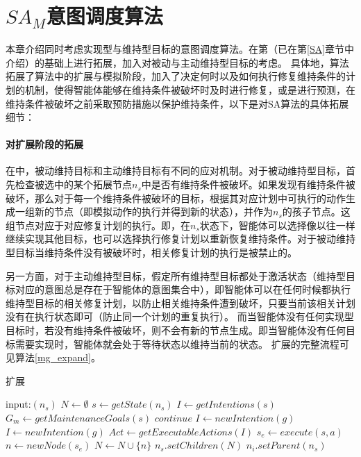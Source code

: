 \section{$SA_M$意图调度算法}
本章介绍同时考虑实现型与维持型目标的意图调度算法\SAM 。\SAM 在第\SA （已在第\ref{SA}章节中介绍）的基础上进行拓展，加入对被动与主动维持型目标的考虑。
具体地，\SAM 算法拓展了\SA 算法中的扩展与模拟阶段，加入了决定何时以及如何执行修复维持条件的计划的机制，使得智能体能够在维持条件被破坏时及时进行修复，或是进行预测，在维持条件被破坏之前采取预防措施以保护维持条件，以下是对SA算法的具体拓展细节：

\paragraph{对扩展阶段的拓展}
在\SAM 中，被动维持目标和主动维持目标有不同的应对机制。对于被动维持型目标，\SAM 首先检查被选中的某个拓展节点$n_s$中是否有维持条件被破坏。如果发现有维持条件被破坏，那么对于每一个维持条件被破坏的目标，根据其对应计划中可执行的动作生成一组新的节点（即模拟动作的执行并得到新的状态），并作为$n_s$的孩子节点。这组节点对应于对应修复计划的执行。即，在$n_s$状态下，智能体可以选择像以往一样继续实现其他目标，也可以选择执行修复计划以重新恢复维持条件。对于被动维持型目标当维持条件没有被破坏时，相关修复计划的执行是被禁止的。

另一方面，对于主动维持型目标，\SAM 假定所有维持型目标都处于激活状态（维持型目标对应的意图总是存在于智能体的意图集合中），即智能体可以在任何时候都执行维持型目标的相关修复计划，以防止相关维持条件遭到破坏，只要当前该相关计划没有在执行状态即可（防止同一个计划的重复执行）。
而当智能体没有任何实现型目标时，若没有维持条件被破坏，则不会有新的节点生成。即当智能体没有任何目标需要实现时，智能体就会处于等待状态以维持当前的状态。
扩展的完整流程可见算法\ref{mg_expand}。
\begin{algorithm}[H]
\caption{扩展}\label{mg_expand}
\begin{algorithmic}[1]
\STATE input:$(n_s)$
      \STATE $N \gets \emptyset$
      \STATE $s \gets getState(n_s)$
      \STATE $I \gets getIntentions(s)$
      \STATE $G_m \gets getMaintenanceGoals(s)$
        \STATE $continue$
      \ENDIF
        \STATE $I \gets newIntention(g)$
      \ENDIF
        \STATE $I \gets newIntention(g)$
      \ENDIF
    \ENDFOR
    \STATE $Act \gets getExecutableActions(I)$
      \STATE $s_e \gets execute(s, a)$
      \STATE $n \gets newNode(s_e)$
      \STATE $N \gets N \cup \{n\}$
    \ENDFOR
    \STATE $n_s.setChildren(N)$
    \STATE $n_i.setParent(n_s)$
    \ENDFOR
\end{algorithmic}
\end{algorithm}


